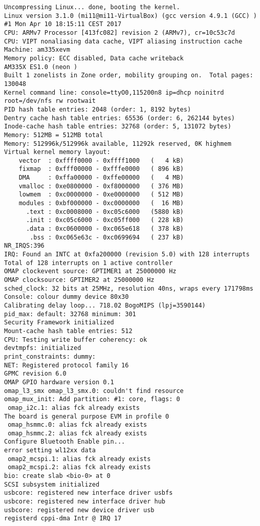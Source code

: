 \documentclass[a4paper,12pt]{report}
\begin{document}
\begin{lstlisting}[caption=Messages de sortie du terminal entre l'allumage de la cible et le prompt de login, label=message_sortie]
Uncompressing Linux... done, booting the kernel.
Linux version 3.1.0 (mi11@mi11-VirtualBox) (gcc version 4.9.1 (GCC) ) #1 Mon Apr 10 18:15:11 CEST 2017
CPU: ARMv7 Processor [413fc082] revision 2 (ARMv7), cr=10c53c7d
CPU: VIPT nonaliasing data cache, VIPT aliasing instruction cache
Machine: am335xevm
Memory policy: ECC disabled, Data cache writeback
AM335X ES1.0 (neon )
Built 1 zonelists in Zone order, mobility grouping on.  Total pages: 130048
Kernel command line: console=ttyO0,115200n8 ip=dhcp noinitrd root=/dev/nfs rw rootwait
PID hash table entries: 2048 (order: 1, 8192 bytes)
Dentry cache hash table entries: 65536 (order: 6, 262144 bytes)
Inode-cache hash table entries: 32768 (order: 5, 131072 bytes)
Memory: 512MB = 512MB total
Memory: 512996k/512996k available, 11292k reserved, 0K highmem
Virtual kernel memory layout:
    vector  : 0xffff0000 - 0xffff1000   (   4 kB)
    fixmap  : 0xfff00000 - 0xfffe0000   ( 896 kB)
    DMA     : 0xffa00000 - 0xffe00000   (   4 MB)
    vmalloc : 0xe0800000 - 0xf8000000   ( 376 MB)
    lowmem  : 0xc0000000 - 0xe0000000   ( 512 MB)
    modules : 0xbf000000 - 0xc0000000   (  16 MB)
      .text : 0xc0008000 - 0xc05c6000   (5880 kB)
      .init : 0xc05c6000 - 0xc05ff000   ( 228 kB)
      .data : 0xc0600000 - 0xc065e618   ( 378 kB)
       .bss : 0xc065e63c - 0xc0699694   ( 237 kB)
NR_IRQS:396
IRQ: Found an INTC at 0xfa200000 (revision 5.0) with 128 interrupts
Total of 128 interrupts on 1 active controller
OMAP clockevent source: GPTIMER1 at 25000000 Hz
OMAP clocksource: GPTIMER2 at 25000000 Hz
sched_clock: 32 bits at 25MHz, resolution 40ns, wraps every 171798ms
Console: colour dummy device 80x30
Calibrating delay loop... 718.02 BogoMIPS (lpj=3590144)
pid_max: default: 32768 minimum: 301
Security Framework initialized
Mount-cache hash table entries: 512
CPU: Testing write buffer coherency: ok
devtmpfs: initialized
print_constraints: dummy: 
NET: Registered protocol family 16
GPMC revision 6.0
OMAP GPIO hardware version 0.1
omap_l3_smx omap_l3_smx.0: couldn't find resource
omap_mux_init: Add partition: #1: core, flags: 0
 omap_i2c.1: alias fck already exists
The board is general purpose EVM in profile 0
 omap_hsmmc.0: alias fck already exists
 omap_hsmmc.2: alias fck already exists
Configure Bluetooth Enable pin...
error setting wl12xx data
 omap2_mcspi.1: alias fck already exists
 omap2_mcspi.2: alias fck already exists
bio: create slab <bio-0> at 0
SCSI subsystem initialized
usbcore: registered new interface driver usbfs
usbcore: registered new interface driver hub
usbcore: registered new device driver usb
registerd cppi-dma Intr @ IRQ 17

\end{lstlisting}
\end{document}
